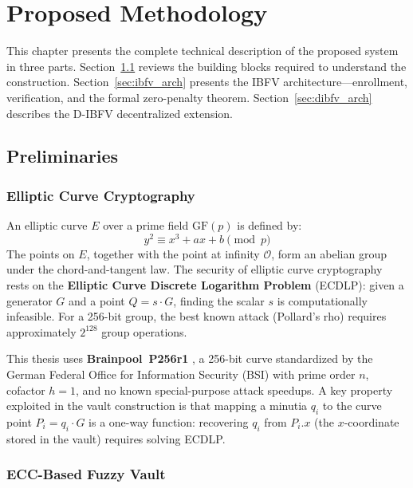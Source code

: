 \chapter{Proposed Methodology}
\label{ch:methodology}

This chapter presents the complete technical description of the proposed system in
three parts. Section~\ref{sec:prelims} reviews the building blocks required to
understand the construction. Section~\ref{sec:ibfv_arch} presents the IBFV
architecture---enrollment, verification, and the formal zero-penalty theorem.
Section~\ref{sec:dibfv_arch} describes the D-IBFV decentralized extension.

\section{Preliminaries}
\label{sec:prelims}

\subsection{Elliptic Curve Cryptography}
\label{sec:ecc_prelim}

An elliptic curve $E$ over a prime field $\mathrm{GF}(p)$ is defined by:
\begin{equation}
  y^2 \equiv x^3 + ax + b \pmod{p}
\end{equation}
The points on $E$, together with the point at infinity $\mathcal{O}$, form an
abelian group under the chord-and-tangent law. The security of elliptic curve
cryptography rests on the \textbf{Elliptic Curve Discrete Logarithm Problem}
(ECDLP): given a generator $G$ and a point $Q = s \cdot G$, finding the scalar
$s$ is computationally infeasible. For a 256-bit group, the best known attack
(Pollard's rho) requires approximately $2^{128}$ group operations.

This thesis uses \textbf{Brainpool~P256r1} \cite{rfc5639}, a 256-bit curve
standardized by the German Federal Office for Information Security (BSI) with
prime order $n$, cofactor $h = 1$, and no known special-purpose attack speedups.
A key property exploited in the vault construction is that mapping a minutia
$q_i$ to the curve point $P_i = q_i \cdot G$ is a one-way function: recovering
$q_i$ from $P_i.x$ (the $x$-coordinate stored in the vault) requires solving ECDLP.

\subsection{ECC-Based Fuzzy Vault}
\label{sec:ecc_vault_prelim}

